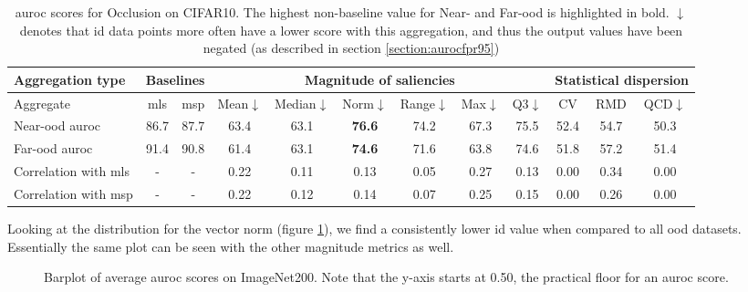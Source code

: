 \documentclass[UKenglish]{uiomasterthesis} %
\theoremstyle{definition}
\begin{document}
\begin{table}[H]
\setlength\tabcolsep{3pt}
\begin{center}
\begin{tabular}{ |p{5.1em}|c c|c c c c c c|c c c| }
    \hline
     \centering Aggregation type & \multicolumn{2}{c|}{Baselines} & \multicolumn{6}{c|}{Magnitude of saliencies} & \multicolumn{3}{p{8em}|}{\centering Statistical dispersion} \\
    \hline
    Aggregate & \ac{mls} & \ac{msp} & Mean$\downarrow$ & Median$\downarrow$ & Norm$\downarrow$ & Range$\downarrow$ & Max$\downarrow$ & Q3$\downarrow$ & CV & RMD & QCD$\downarrow$  \\
    \hline
    \rowcolor{near!50}
    Near-\ac{ood} \ac{auroc} & 86.7 & 87.7 & 63.4 & 63.1 &\textbf{ 76.6 }& 74.2 & 67.3 & 75.5 & 52.4 & 54.7 & 50.3  \\
    \hline
    \rowcolor{far!50}
    Far-\ac{ood} \ac{auroc} & 91.4 & 90.8 & 61.4 & 63.1 &\textbf{ 74.6 }& 71.6 & 63.8 & 74.6 & 51.8 & 57.2 & 51.4  \\
    \hline
    Correlation with \ac{mls}& - & - & 0.22 & 0.11 & 0.13 & 0.05 & 0.27 & 0.13 & 0.00 & 0.34 & 0.00  \\
    \hline
    Correlation with \ac{msp}& - & - & 0.22 & 0.12 & 0.14 & 0.07 & 0.25 & 0.15 & 0.00 & 0.26 & 0.00  \\
    \hline
    \end{tabular}
    \caption[\ac{auroc} scores for Occlusion on CIFAR10]{\ac{auroc} scores for Occlusion on CIFAR10. The highest non-baseline value for Near- and Far-\ac{ood} is highlighted in bold. $\downarrow$ denotes that \ac{id} data points more often have a lower score with this aggregation, and thus the output values have been negated (as described in section \ref{section:aurocfpr95})}
    \label{table:cifar10_occlusion_metrics}
\end{center}
\setlength\tabcolsep{6pt}
\end{table}

Looking at the distribution for the vector norm (figure \ref{fig:cifar10_occlusion_norm}), we find a consistently lower \ac{id} value when compared to all \ac{ood} datasets. Essentially the same plot can be seen with the other magnitude metrics as well.

\begin{figure}[H]
    \begin{center}
        
    \end{center}
    \caption[Average scores]{Barplot of average \ac{auroc} scores on ImageNet200. Note that the y-axis starts at 0.50, the practical floor for an \ac{auroc} score.}
    \label{fig:cifar10_occlusion_norm}
\end{figure}
\end{document}
